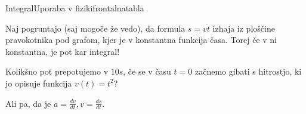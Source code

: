 \begin{priprava}{}{}{Integral}{Uporaba v fiziki}{frontalna}{tabla}


Naj pogruntajo (saj mogoče že vedo), da formula $ s = v \dot t $ izhaja iz ploščine pravokotnika pod grafom, kjer je v konstantna funkcija časa. Torej če v ni konstantna, je pot kar integral!

Kolikšno pot prepotujemo v $ 10 s $, če se v času $ t = 0 $ začnemo gibati s hitrostjo, ki jo opisuje funkcija $ v(t) = t^2 $?


Ali pa, da je $ a = \frac{dv}{dt}, v = \frac{ds}{dt} $.
    
\end{priprava}